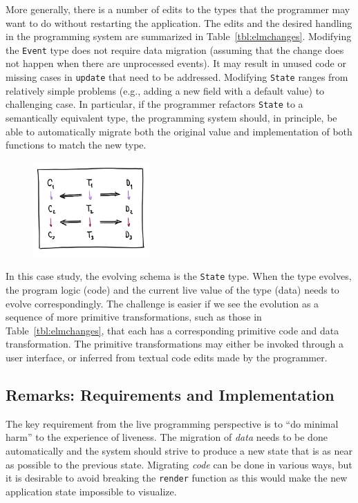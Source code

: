 \documentclass[english,submission]{programming}
\DeclareRobustCommand{\frameworkbox}[1]{\leftbar#1\endleftbar}
\newcommand{\frameworkboxtitle}[1]{\noindent{\firamedium #1.}\quad}
\begin{document}
More generally, there is a number of edits to the types that the programmer may want to do
without restarting the application. The edits and the desired handling in the programming
system are summarized in Table~\ref{tbl:elmchanges}. Modifying the \texttt{Event} type does not
require data migration (assuming that the change does not happen when there are unprocessed
events). It may result in unused code or missing cases in \texttt{update} that need to be addressed.
Modifying \texttt{State} ranges from relatively simple problems (e.g., adding a new field with a
default value) to challenging case. In particular, if the programmer refactors \texttt{State} to a
semantically equivalent type, the programming system should, in principle, be able to automatically
migrate both the original value and implementation of both functions to match the new type.

\frameworkbox{
\begin{figure}
\vspace{0em}
\includegraphics[width=12em]{figures/arr-steps.png}
\vspace{0em}
\end{figure}
\frameworkboxtitle{Primitive Schema Transformations}
In this case study, the evolving schema is the \texttt{State} type. When the type evolves,
the program logic (code) and the current live value of the type (data) needs to evolve
correspondingly. The challenge is easier if we see the evolution as a sequence of more primitive
transformations, such as those in Table~\ref{tbl:elmchanges}, that each has a corresponding
primitive code and data transformation. The primitive transformations may either be invoked
through a user interface, or inferred from textual code edits made by the programmer.
}

\subsection*{Remarks: Requirements and Implementation}
The key requirement from the live programming perspective is to ``do minimal harm'' to the experience of liveness.
The migration of \emph{data} needs to be done automatically and the system should strive
to produce a new state that is as near as possible to the previous state. Migrating
\emph{code} can be done in various ways,
but it is desirable to avoid breaking the \texttt{render} function as this would make the
new application state impossible to visualize.
\end{document}
